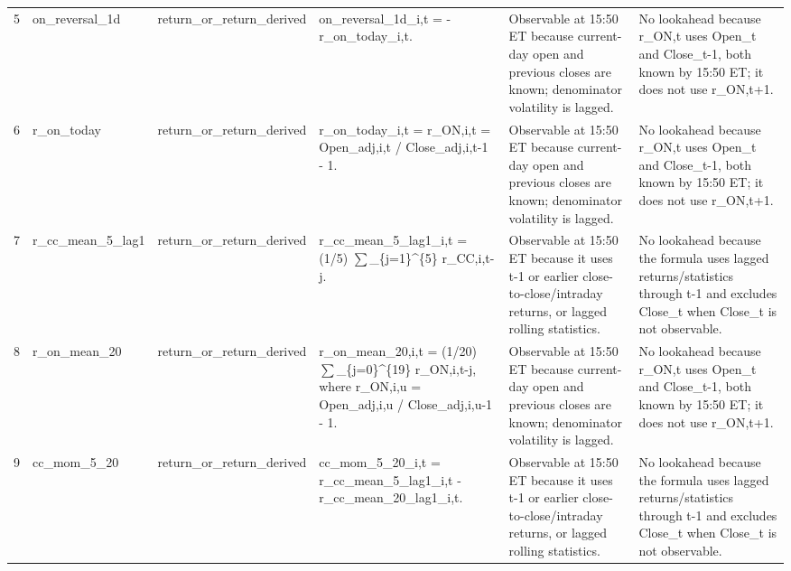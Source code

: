 \begin{landscape}
\begin{longtable}{P{0.42cm} P{2.25cm} P{2.05cm} P{5.25cm} P{4.85cm} P{5.25cm}}
5 & on\_\allowbreak{}reversal\_\allowbreak{}1d & return\_\allowbreak{}or\_\allowbreak{}return\_\allowbreak{}derived & on\_\allowbreak{}reversal\_\allowbreak{}1d\_\allowbreak{}i,t = - r\_\allowbreak{}on\_\allowbreak{}today\_\allowbreak{}i,t. & Observable at 15:50 ET because current-day open and previous closes are known; denominator volatility is lagged. & No lookahead because r\_\allowbreak{}ON,t uses Open\_\allowbreak{}t and Close\_\allowbreak{}t-1, both known by 15:50 ET; it does not use r\_\allowbreak{}ON,t+1. \\
6 & r\_\allowbreak{}on\_\allowbreak{}today & return\_\allowbreak{}or\_\allowbreak{}return\_\allowbreak{}derived & r\_\allowbreak{}on\_\allowbreak{}today\_\allowbreak{}i,t = r\_\allowbreak{}ON,i,t = Open\_\allowbreak{}adj,i,t / Close\_\allowbreak{}adj,i,t-1 - 1. & Observable at 15:50 ET because current-day open and previous closes are known; denominator volatility is lagged. & No lookahead because r\_\allowbreak{}ON,t uses Open\_\allowbreak{}t and Close\_\allowbreak{}t-1, both known by 15:50 ET; it does not use r\_\allowbreak{}ON,t+1. \\
7 & r\_\allowbreak{}cc\_\allowbreak{}mean\_\allowbreak{}5\_\allowbreak{}lag1 & return\_\allowbreak{}or\_\allowbreak{}return\_\allowbreak{}derived & r\_\allowbreak{}cc\_\allowbreak{}mean\_\allowbreak{}5\_\allowbreak{}lag1\_\allowbreak{}i,t = (1/5) $\sum$\_\allowbreak{}\{j=1\}\textasciicircum{}\{5\} r\_\allowbreak{}CC,i,t-j. & Observable at 15:50 ET because it uses t-1 or earlier close-to-close/intraday returns, or lagged rolling statistics. & No lookahead because the formula uses lagged returns/statistics through t-1 and excludes Close\_\allowbreak{}t when Close\_\allowbreak{}t is not observable. \\
8 & r\_\allowbreak{}on\_\allowbreak{}mean\_\allowbreak{}20 & return\_\allowbreak{}or\_\allowbreak{}return\_\allowbreak{}derived & r\_\allowbreak{}on\_\allowbreak{}mean\_\allowbreak{}20,i,t = (1/20) $\sum$\_\allowbreak{}\{j=0\}\textasciicircum{}\{19\} r\_\allowbreak{}ON,i,t-j, where r\_\allowbreak{}ON,i,u = Open\_\allowbreak{}adj,i,u / Close\_\allowbreak{}adj,i,u-1 - 1. & Observable at 15:50 ET because current-day open and previous closes are known; denominator volatility is lagged. & No lookahead because r\_\allowbreak{}ON,t uses Open\_\allowbreak{}t and Close\_\allowbreak{}t-1, both known by 15:50 ET; it does not use r\_\allowbreak{}ON,t+1. \\
9 & cc\_\allowbreak{}mom\_\allowbreak{}5\_\allowbreak{}20 & return\_\allowbreak{}or\_\allowbreak{}return\_\allowbreak{}derived & cc\_\allowbreak{}mom\_\allowbreak{}5\_\allowbreak{}20\_\allowbreak{}i,t = r\_\allowbreak{}cc\_\allowbreak{}mean\_\allowbreak{}5\_\allowbreak{}lag1\_\allowbreak{}i,t - r\_\allowbreak{}cc\_\allowbreak{}mean\_\allowbreak{}20\_\allowbreak{}lag1\_\allowbreak{}i,t. & Observable at 15:50 ET because it uses t-1 or earlier close-to-close/intraday returns, or lagged rolling statistics. & No lookahead because the formula uses lagged returns/statistics through t-1 and excludes Close\_\allowbreak{}t when Close\_\allowbreak{}t is not observable. \\

\end{longtable}
\end{landscape}
